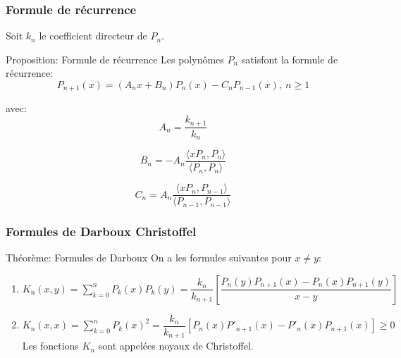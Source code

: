 \documentclass[xcolor=dvipsnames,10pt,mathserif]{beamer}
\theoremstyle{plain}
\newcommand{\la}{\langle}
\newcommand{\ra}{\rangle}
\begin{document}
\begin{frame} \frametitle{Formule de récurrence \hfill \insertpagenumber}
Soit $k_n$ le coefficient directeur de $P_n$.
\begin{block}{Proposition: Formule de récurrence}
Les polynômes $P_n$ satisfont la formule de récurrence:
\begin{equation}
 P_{n+1}(x)= (A_n x+B_n)P_n(x) - C_n P_{n-1}(x),\ n \geqslant 1 
\end{equation}

avec:
\begin{equation}
A_n = \dfrac{k_{n+1}}{k_n}
\end{equation}

\begin{equation}
B_n = -A_n \dfrac{\la x P_n, P_n \ra}{\la P_n, P_n \ra}
\end{equation}

\begin{equation}
C_n=A_n \dfrac{\la x P_n, P_{n-1} \ra}{\la P_{n-1}, P_{n-1} \ra}
\end{equation}

\end{block}

\end{frame}
  
\begin{frame} \frametitle{Formules de Darboux Christoffel \hfill \insertpagenumber}

\begin{block}{Théorème: Formules de Darboux}
On a les formules suivantes pour $x \neq y$:
\begin{enumerate}
\item $K_n(x,y)= \sum\limits_{k=0}^n P_k(x)P_k(y)=\dfrac{k_n}{k_{n+1}} [\dfrac{P_n(y)P_{n+1}(x)-P_n(x)P_{n+1}(y)}{x-y}] $
\item $ K_n(x,x) = \sum\limits_{k=0}^n {P_k(x)}^2 = \dfrac{k_n}{k_{n+1}}[P_n(x)P'_{n+1}(x)-P'_n(x)P_{n+1}(x)]\geqslant 0$
\\Les fonctions $K_n$ sont appelées noyaux de Christoffel.
\end{enumerate}
\end{block}

\end{frame}
 
\end{document}

